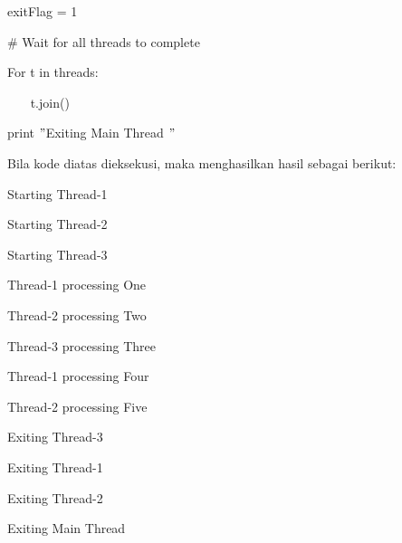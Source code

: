 \documentclass [12pt,a4paper,notitlepage,oneside,bahasa]{article}
\begin{document}
\noindent 
{\fontsize{10pt}{10pt}\selectfont exitFlag = 1} \par
\vspace{10pt}
\noindent 
{\fontsize{10pt}{10pt}\selectfont  $  \#  $ Wait for all threads to complete} \par
\noindent 
{\fontsize{10pt}{10pt}\selectfont For t in threads:} \par
\noindent 
{\fontsize{10pt}{10pt}\selectfont ~~~ t.join()} \par
\noindent 
{\fontsize{10pt}{10pt}\selectfont print  $ " $Exiting Main Thread $ " $} \par
\vspace{10pt}
\noindent 
Bila kode diatas dieksekusi, maka menghasilkan hasil sebagai berikut: \par
\vspace{12pt}
\noindent 
{\fontsize{10pt}{10pt}\selectfont Starting Thread-1} \par
\noindent 
{\fontsize{10pt}{10pt}\selectfont Starting Thread-2} \par
\noindent 
{\fontsize{10pt}{10pt}\selectfont Starting Thread-3} \par
\noindent 
{\fontsize{10pt}{10pt}\selectfont Thread-1 processing One} \par
\noindent 
{\fontsize{10pt}{10pt}\selectfont Thread-2 processing Two} \par
\noindent 
{\fontsize{10pt}{10pt}\selectfont Thread-3 processing Three} \par
\noindent 
{\fontsize{10pt}{10pt}\selectfont Thread-1 processing Four} \par
\noindent 
{\fontsize{10pt}{10pt}\selectfont Thread-2 processing Five} \par
\noindent 
{\fontsize{10pt}{10pt}\selectfont Exiting Thread-3} \par
\noindent 
{\fontsize{10pt}{10pt}\selectfont Exiting Thread-1} \par
\noindent 
{\fontsize{10pt}{10pt}\selectfont Exiting Thread-2} \par
\noindent 
{\fontsize{10pt}{10pt}\selectfont Exiting Main Thread} \par
\vspace{12pt}
\end{document}

